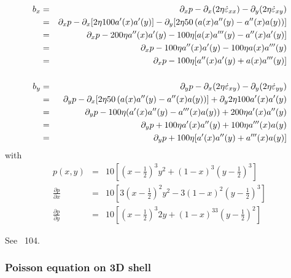 \begin{eqnarray}
b_x 
&=& \partial_x p - \partial_x (2\eta \dot{\varepsilon}_{xx}) - \partial_y (2\eta \dot{\varepsilon}_{xy}) \nonumber\\
&=& \partial_x p - \partial_x [2 \eta 100 a'(x)a'(y) ]
- \partial_y [2 \eta 50 \left( a(x)a''(y) - a''(x) a(y) \right) ] \nonumber\\
&=& \partial_x p -  200 \eta a''(x)a'(y) - 
100\eta [ a(x)a'''(y) - a''(x)a'(y)] \nonumber\\
&=& \partial_x p - 100 \eta a''(x)a'(y) - 100\eta  a(x)a'''(y) \nonumber\\ 
&=& \partial_x p - 100 \eta [a''(x)a'(y) + a(x)a'''(y) ]
\nonumber\\ \nonumber\\
b_y 
&=&  \partial_y p - \partial_x (2\eta \dot{\varepsilon}_{xy}) - \partial_y (2\eta \dot{\varepsilon}_{yy}) \nonumber\\
&=&  \partial_y p - \partial_x 
[2\eta  50 \left( a(x)a''(y) - a''(x) a(y) \right) ]
+ \partial_y 2 \eta 100 a'(x)a'(y) \nonumber\\
&=&  \partial_y p - 100\eta (a'(x)a''(y) -a'''(x) a(y)  ) + 200 \eta a'(x)a''(y)\nonumber \\ 
&=&  \partial_y p + 100 \eta a'(x)a''(y) + 100 \eta a'''(x) a(y) \nonumber\\
&=& \partial_y p + 100 \eta [ a'(x)a''(y) +  a'''(x) a(y) ] \nonumber
\end{eqnarray}
with 
\begin{eqnarray}
p(x,y)&=&10
\left[
\left(x-\frac12\right)^3y^2
+(1-x)^3\left(y-\frac12\right)^3  
\right]
\nonumber\\
\frac{\partial p}{\partial x} &=& 10 \left[3 \left(x-\frac12\right)^2 y^2
-3 (1-x)^2 \left(y-\frac12\right)^3  \right] \nonumber\\
\frac{\partial p}{\partial y}  &=& 10 \left[  
\left(x-\frac12\right)^3 2y
+(1-x)^33 \left(y-\frac12\right)^2
\right] \nonumber
\end{eqnarray}

See \stone~104.







\subsubsection{Poisson equation on 3D shell} 

